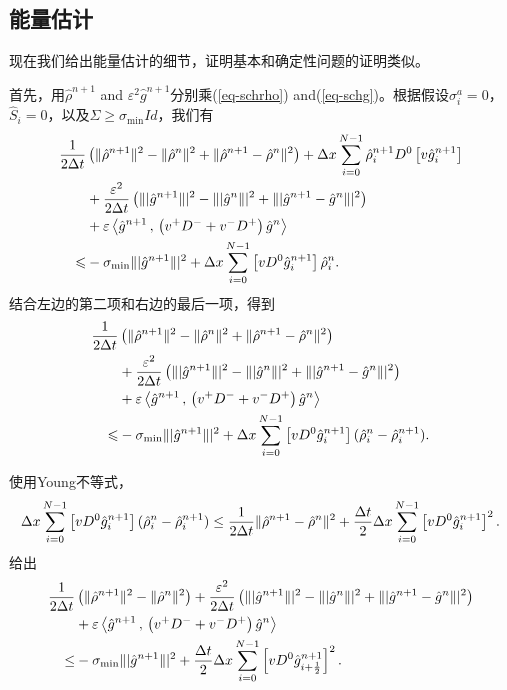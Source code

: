    \subsection{能量估计}
   \label{subsec:ener}

现在我们给出能量估计的细节，证明基本和确定性问题的证明类似。

首先，用$\hat \rho^{n+1}$ and $\varepsilon^2 \hat g^{n+1}$分别乘(\ref{eq-schrho}) and(\ref{eq-schg})。根据假设$\sigma_i^a=0$， $\hat S_i=0$，以及$\Sigma \ge \sigma_{\text{min}} Id$，我们有
\begin{equation*}
\begin{split}
\frac{1}{2\Delta t} & \left(  \|\hat{\rho}^{n+1}\|^2-\|\hat{\rho}^n\|^2+\|\hat{\rho}^{n+1}-\hat{\rho}^n\|^2\right)
 + \Delta x \sum_{i=0}^{N-1} \hat{\rho}^{n+1}_{i}D^0\left[ v\hat{g}^{n+1}_i \right] \\
& + \frac{\varepsilon^2}{2\Delta t} \left( \||\hat{g}^{n+1}\||^2-\||\hat{g}^n\||^2 +
  \||\hat{g}^{n+1}-\hat{g}^n\||^2  \right) \\
& + \varepsilon
\left\langle\hat{g}^{n+1} \, , \, \left(v^+D^-+v^-D^+\right)\hat{g}^n\right\rangle \\
\leqslant & -\sigma_\text{{min}} \||\hat{g}^{n+1}\||^2 + \Delta x \sum_{i=0}^{N-1} \left[ vD^0\hat{g}^{n+1}_i \right] \hat{\rho}^n_{i}.
\end{split}
\end{equation*}
结合左边的第二项和右边的最后一项，得到
\begin{equation*}
\begin{split}
\frac{1}{2\Delta t} & \left(  \|\hat{\rho}^{n+1}\|^2-\|\hat{\rho}^n\|^2+\|\hat{\rho}^{n+1}-\hat{\rho}^n\|^2\right)\\
& + \frac{\varepsilon^2}{2\Delta t} \left( \||\hat{g}^{n+1}\||^2-\||\hat{g}^n\||^2 +
  \||\hat{g}^{n+1}-\hat{g}^n\||^2  \right) \\
& + \varepsilon
\left\langle\hat{g}^{n+1} \, , \, \left(v^+D^-+v^-D^+\right)\hat{g}^n\right\rangle \\
\leqslant & -\sigma_{\text{min}} \||\hat{g}^{n+1}\||^2 + \Delta x \sum_{i=0}^{N-1} \left[ vD^0\hat{g}^{n+1}_i \right] (\hat{\rho}^n_{i} - \hat{\rho}^{n+1}_{i}).
\end{split}
\end{equation*}

使用Young不等式，
$$
\Delta x\sum_{i=0}^{N-1} \left[ vD^0\hat{g}^{n+1}_i \right](\hat{\rho}^n_{i}-\hat{\rho}^{n+1}_{i})
\leq \frac{1}{2\Delta t} \|\hat{\rho}^{n+1}-\hat{\rho}^n\|^2
+\frac{\Delta t}{2}\Delta x \sum_{i=0}^{N-1} \left[ vD^0\hat{g}^{n+1}_i \right]^2.
$$
给出
\begin{equation*}
\begin{split}
\frac{1}{2\Delta t} & \left(  \|\hat{\rho}^{n+1}\|^2-\|\hat{\rho}^n\|^2\right)
 + \frac{\varepsilon^2}{2\Delta t} \left( \||\hat{g}^{n+1}\||^2-\||\hat{g}^n\||^2 +  \||\hat{g}^{n+1}-\hat{g}^n\||^2  \right) \\
& + \varepsilon \left\langle\hat{g}^{n+1} \, , \, \left(v^+D^-+v^-D^+\right)\hat{g}^n\right\rangle \\
\leq &
-\sigma_{\text{min}} \||\hat{g}^{n+1}\||^2 +\frac{\Delta t}{2} \Delta x \sum_{i=0}^{N-1} \left[ vD^0\hat{g}^{n+1}_{i+\frac{1}{2}} \right]^2.
\end{split}
\end{equation*}

